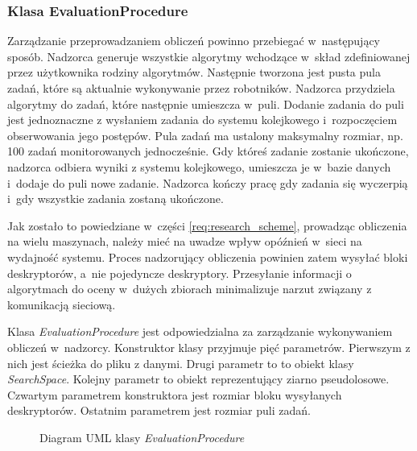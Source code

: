 \documentclass[../thesis.tex]{subfiles}
\begin{document}
\subsubsection{Klasa EvaluationProcedure}

Zarządzanie przeprowadzaniem obliczeń powinno przebiegać w~następujący sposób. Nadzorca generuje wszystkie algorytmy wchodzące w~skład zdefiniowanej przez użytkownika rodziny algorytmów. Następnie tworzona jest pusta pula zadań, które są aktualnie wykonywanie przez robotników. Nadzorca przydziela algorytmy do zadań, które następnie umieszcza w~puli. Dodanie zadania do puli jest jednoznaczne z wysłaniem zadania do systemu kolejkowego i~rozpoczęciem obserwowania jego postępów. Pula zadań ma ustalony maksymalny rozmiar, np. 100 zadań monitorowanych jednocześnie. Gdy któreś zadanie zostanie ukończone, nadzorca odbiera wyniki z systemu kolejkowego, umieszcza je w~bazie danych i~dodaje do puli nowe zadanie. Nadzorca kończy pracę gdy zadania się wyczerpią i~gdy wszystkie zadania zostaną ukończone.

Jak zostało to powiedziane w~części \ref{req:research_scheme}, prowadząc obliczenia na wielu maszynach, należy mieć na uwadze wpływ opóźnień w~sieci na wydajność systemu. Proces nadzorujący obliczenia powinien zatem wysyłać bloki deskryptorów, a~nie pojedyncze deskryptory. Przesyłanie informacji o algorytmach do oceny w~dużych zbiorach minimalizuje narzut związany z komunikacją sieciową. 

Klasa \emph{EvaluationProcedure} jest odpowiedzialna za zarządzanie wykonywaniem obliczeń w~nadzorcy. Konstruktor klasy przyjmuje pięć parametrów. Pierwszym z nich jest ścieżka do pliku z danymi. Drugi parametr to to obiekt klasy \emph{SearchSpace}. Kolejny parametr to obiekt reprezentujący ziarno pseudolosowe. Czwartym parametrem konstruktora jest rozmiar bloku wysyłanych deskryptorów. Ostatnim parametrem jest rozmiar puli zadań.

\begin{figure}[h]
\centering
{}
\caption{Diagram UML klasy \emph{EvaluationProcedure}}
\label{proj:diagram_evaluation_procedure}
\end{figure}
\end{document}
